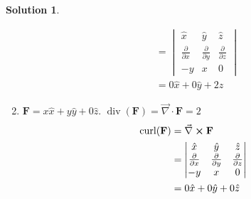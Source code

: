 \documentclass[10pt]{article}
\theoremstyle{definition}
\newtheorem{soln}{Solution}
\newcommand{\ux}{\hat{x}}
\newcommand{\uy}{\hat{y}}
\newcommand{\uz}{\hat{z}}
\DeclareMathOperator{\Div}{div}
\DeclareMathOperator{\Curl}{curl}
\begin{document}
\begin{soln}
\begin{enumerate}[label=(\alph*)]
\begin{align*}
                              & =\begin{vmatrix}
                                   \ux                          & \uy                         & \uz                         \\
                                   \frac{\partial}{\partial x} & \frac{\partial}{\partial y} & \frac{\partial}{\partial z} \\
                                   -y                           & x                           & 0
                                 \end{vmatrix} \\
                              & = 0\ux + 0\uy +2\uz
          \end{align*}
    \item $\mathbf{F}=x\ux+y\uy+0\uz$. $\Div(\mathbf{F})=\vec{\nabla} \cdot \mathbf{F}=2$
          \begin{align*}
            \Curl(\mathbf{F}) & =\vec{\nabla} \cross \mathbf{F}                                                          \\
                              & =\begin{vmatrix}
                                   \ux                         & \uy                         & \uz                         \\
                                   \frac{\partial}{\partial x} & \frac{\partial}{\partial y} & \frac{\partial}{\partial z} \\
                                   -y                          & x                           & 0
                                 \end{vmatrix} \\
                              & = 0\ux + 0\uy +0\uz
          \end{align*}
  \end{enumerate}
\end{soln}
\newpage
\end{document}

